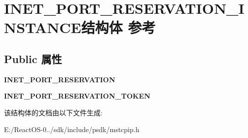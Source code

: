 \hypertarget{struct_i_n_e_t___p_o_r_t___r_e_s_e_r_v_a_t_i_o_n___i_n_s_t_a_n_c_e}{}\section{I\+N\+E\+T\+\_\+\+P\+O\+R\+T\+\_\+\+R\+E\+S\+E\+R\+V\+A\+T\+I\+O\+N\+\_\+\+I\+N\+S\+T\+A\+N\+C\+E结构体 参考}
\label{struct_i_n_e_t___p_o_r_t___r_e_s_e_r_v_a_t_i_o_n___i_n_s_t_a_n_c_e}
\subsection*{Public 属性}
\begin{DoxyCompactItemize}
\item 
\mbox{\label{struct_i_n_e_t___p_o_r_t___r_e_s_e_r_v_a_t_i_o_n___i_n_s_t_a_n_c_e_aa6d7fe32a76320d6eeb120661e203302}} 
{\bfseries I\+N\+E\+T\+\_\+\+P\+O\+R\+T\+\_\+\+R\+E\+S\+E\+R\+V\+A\+T\+I\+ON}
\item 
\mbox{\label{struct_i_n_e_t___p_o_r_t___r_e_s_e_r_v_a_t_i_o_n___i_n_s_t_a_n_c_e_a5547c6d20086733b23df7eff5565233c}} 
{\bfseries I\+N\+E\+T\+\_\+\+P\+O\+R\+T\+\_\+\+R\+E\+S\+E\+R\+V\+A\+T\+I\+O\+N\+\_\+\+T\+O\+K\+EN}
\end{DoxyCompactItemize}


该结构体的文档由以下文件生成\+:\begin{DoxyCompactItemize}
\item 
E\+:/\+React\+O\+S-\/0../sdk/include/psdk/mstcpip.\+h\end{DoxyCompactItemize}
